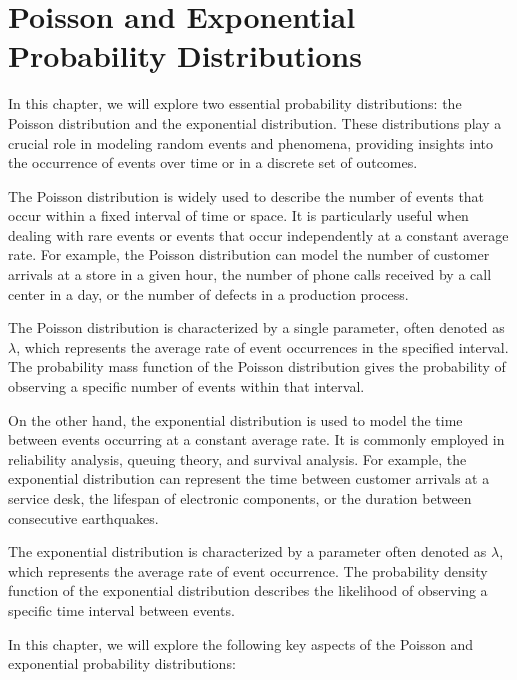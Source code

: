 \chapter{Poisson and Exponential Probability Distributions}

In this chapter, we will explore two essential probability
distributions: the Poisson distribution and the exponential
distribution. These distributions play a crucial role in modeling
random events and phenomena, providing insights into the occurrence of
events over time or in a discrete set of outcomes.

The Poisson distribution is widely used to describe the number of
events that occur within a fixed interval of time or space. It is
particularly useful when dealing with rare events or events that occur
independently at a constant average rate. For example, the Poisson
distribution can model the number of customer arrivals at a store in a
given hour, the number of phone calls received by a call center in a
day, or the number of defects in a production process.

The Poisson distribution is characterized by a single parameter, often
denoted as $\lambda$, which represents the average rate of event
occurrences in the specified interval. The probability mass function
of the Poisson distribution gives the probability of observing a
specific number of events within that interval.

On the other hand, the exponential distribution is used to model the
time between events occurring at a constant average rate. It is
commonly employed in reliability analysis, queuing theory, and
survival analysis. For example, the exponential distribution can
represent the time between customer arrivals at a service desk, the
lifespan of electronic components, or the duration between consecutive
earthquakes.

The exponential distribution is characterized by a parameter often
denoted as $\lambda$, which represents the average rate of event
occurrence. The probability density function of the exponential
distribution describes the likelihood of observing a specific time
interval between events.

In this chapter, we will explore the following key aspects of the
Poisson and exponential probability distributions:

